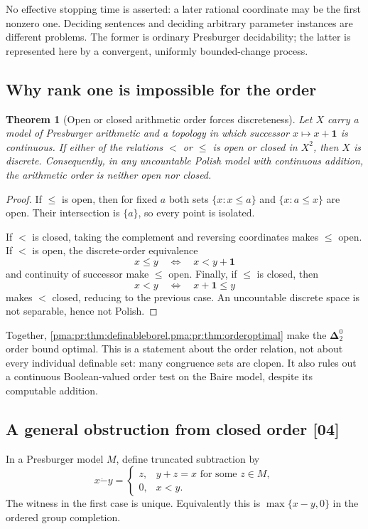 \documentclass[11pt]{article}
\numberwithin{equation}{section}
\newtheorem{theorem}{Theorem}[section]
\theoremstyle{definition}
\theoremstyle{remark}
\newcommand{\one}{\mathbf 1}
\newcommand{\Dtwo}{\boldsymbol{\Delta}^{0}_{2}}
\newcommand{\monus}{\mathbin{\dot{-}}}
\newcommand{\src}[1]{\textup{\textsf{\small[#1]}}}
\begin{document}
No effective stopping time is asserted: a later rational coordinate may
be the first nonzero one. Deciding sentences and deciding arbitrary
parameter instances are different problems. The former is ordinary
Presburger decidability; the latter is represented here by a convergent,
uniformly bounded-change process.

\subsection{Why rank one is impossible for the order}

\begin{theorem}[Open or closed arithmetic order forces discreteness]
\label{pma:pr:thm:orderoptimal}
Let $X$ carry a model of Presburger arithmetic and a topology in which
successor $x\mapsto x+\one$ is continuous. If either of the relations
$<$ or $\leq$ is open or closed in $X^2$, then $X$ is discrete.
Consequently, in any uncountable Polish model with continuous addition,
the arithmetic order is neither open nor closed.
\end{theorem}
\begin{proof}
If $\leq$ is open, then for fixed $a$ both sets
$\{x:x\leq a\}$ and $\{x:a\leq x\}$ are open. Their intersection is
$\{a\}$, so every point is isolated.

If $<$ is closed, taking the complement and reversing coordinates makes
$\leq$ open. If $<$ is open, the discrete-order equivalence
\[
 x\leq y\quad\Longleftrightarrow\quad x<y+\one
\]
and continuity of successor make $\leq$ open. Finally, if $\leq$ is
closed, then
\[
 x<y\quad\Longleftrightarrow\quad x+\one\leq y
\]
makes $<$ closed, reducing to the previous case.
An uncountable discrete space is not separable, hence not Polish.
\end{proof}

Together, \cref{pma:pr:thm:definableborel,pma:pr:thm:orderoptimal} make the $\Dtwo$
order bound optimal. This is a statement about the order relation, not
about every individual definable set: many congruence sets are clopen.
It also rules out a continuous Boolean-valued order test on the Baire
model, despite its computable addition.

\subsection{A general obstruction from closed order \src{04}}\label{pma:pr:sec:regularity}

In a Presburger model $M$, define truncated subtraction by
\[
 x\monus y=
 \begin{cases}z,&y+z=x\text{ for some }z\in M,\\0,&x<y.\end{cases}
\]
The witness in the first case is unique. Equivalently this is
$\max\{x-y,0\}$ in the ordered group completion.
\end{document}
